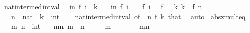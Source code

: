 \begin{isabellebody}
\isamarkupfalse%
%
\endisatagproof
{\isafoldproof}%
%
\isadelimproof
\isanewline
%
\endisadelimproof
\isanewline
{}\isamarkupfalse%
\ nat{}{\isacharunderscore}{\kern0pt}intermed{\isacharunderscore}{\kern0pt}int{\isacharunderscore}{\kern0pt}val{\isacharcolon}{\kern0pt}\isanewline
\ \ {\isachardoublequoteopen}{\isasymexists}i{\isasymle}n{\isachardot}{\kern0pt}\ f\ i\ {\isacharequal}{\kern0pt}\ k{\isachardoublequoteclose}\isanewline
\ \ \ {\isachardoublequoteopen}{\isasymforall}i{\isacharless}{\kern0pt}n{\isachardot}{\kern0pt}\ {\isasymbar}f\ {\isacharparenleft}{\kern0pt}i\ {\isacharplus}{\kern0pt}\ {}{\isacharparenright}{\kern0pt}\ {\isacharminus}{\kern0pt}\ f\ i{\isasymbar}\ {\isasymle}\ {}{\isachardoublequoteclose}\ {\isachardoublequoteopen}f\ {}\ {\isasymle}\ k{\isachardoublequoteclose}\ {\isachardoublequoteopen}k\ {\isasymle}\ f\ n{\isachardoublequoteclose}\isanewline
\ \ \ n\ {\isacharcolon}{\kern0pt}{\isacharcolon}{\kern0pt}\ nat\ \ k\ {\isacharcolon}{\kern0pt}{\isacharcolon}{\kern0pt}\ int\isanewline
%
\isadelimproof
\ \ %
\endisadelimproof
%
\isatagproof
{}\isamarkupfalse%
\ nat{\isacharunderscore}{\kern0pt}intermed{\isacharunderscore}{\kern0pt}int{\isacharunderscore}{\kern0pt}val\ {\isacharbrackleft}{\kern0pt}of\ {}\ n\ f\ k{\isacharbrackright}{\kern0pt}\ that\ \isamarkupfalse%
\ auto%
\endisatagproof
{\isafoldproof}%
%
\isadelimproof
%
\endisadelimproof
%
\isadelimdocument
%
\endisadelimdocument
%
\isatagdocument
%
\isamarkuptrue%
%
\endisatagdocument
{\isafolddocument}%
%
\isadelimdocument
%
\endisadelimdocument
{}\isamarkupfalse%
\ abs{\isacharunderscore}{\kern0pt}zmult{\isacharunderscore}{\kern0pt}eq{\isacharunderscore}{\kern0pt}{}{\isacharcolon}{\kern0pt}\isanewline
\ \ \ m\ n\ {\isacharcolon}{\kern0pt}{\isacharcolon}{\kern0pt}\ int\isanewline
\ \ \ mn{\isacharcolon}{\kern0pt}\ {\isachardoublequoteopen}{\isasymbar}m\ {\isacharasterisk}{\kern0pt}\ n{\isasymbar}\ {\isacharequal}{\kern0pt}\ {}{\isachardoublequoteclose}\isanewline
\ \ \ {\isachardoublequoteopen}{\isasymbar}m{\isasymbar}\ {\isacharequal}{\kern0pt}\ {}{\isachardoublequoteclose}\isanewline
%
\isadelimproof
%
\endisadelimproof
%
\isatagproof
{}\isamarkupfalse%
\ {\isacharminus}{\kern0pt}\isanewline
\ \ \isamarkupfalse%
\ mn\ \isamarkupfalse%

\end{isabellebody}
